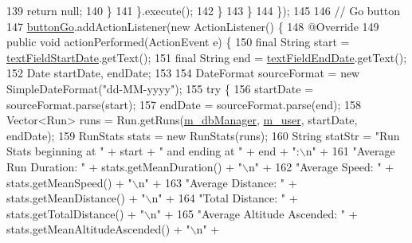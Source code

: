 \begin{DoxyCode}
139                             \textcolor{keywordflow}{return} null;
140                         \}
141                     \}.execute();
142                 \}
143             \}
144         \});
145 
146         \textcolor{comment}{// Go button}
147         \mbox{\hyperlink{classcom_1_1activitytracker_1_1_main_window_ad25fa99a0108ee160ede6865ecf3b6f0}{buttonGo}}.addActionListener(\textcolor{keyword}{new} ActionListener() \{
148             @Override
149             \textcolor{keyword}{public} \textcolor{keywordtype}{void} actionPerformed(ActionEvent e) \{
150                 \textcolor{keyword}{final} String start = \mbox{\hyperlink{classcom_1_1activitytracker_1_1_main_window_a57257f1403dc59df568de3ac51cdb90a}{textFieldStartDate}}.getText();
151                 \textcolor{keyword}{final} String end = \mbox{\hyperlink{classcom_1_1activitytracker_1_1_main_window_ab3ce75740bdeca26fec4325f1d5260e1}{textFieldEndDate}}.getText();
152                 Date startDate, endDate;
153 
154                 DateFormat sourceFormat = \textcolor{keyword}{new} SimpleDateFormat(\textcolor{stringliteral}{"dd-MM-yyyy"});
155                 \textcolor{keywordflow}{try} \{
156                     startDate = sourceFormat.parse(start);
157                     endDate = sourceFormat.parse(end);
158                     Vector<Run> runs = Run.getRuns(\mbox{\hyperlink{classcom_1_1activitytracker_1_1_main_window_ab2af51cb35794567e55564a4d3abbb79}{m\_dbManager}}, 
      \mbox{\hyperlink{classcom_1_1activitytracker_1_1_main_window_a96e28fa47e1740a7ddc16aa48406db85}{m\_user}}, startDate, endDate);
159                     RunStats stats = \textcolor{keyword}{new} RunStats(runs);
160                     String statStr = \textcolor{stringliteral}{"Run Stats beginning at "} + start + \textcolor{stringliteral}{" and ending at "} + end + \textcolor{stringliteral}{":\(\backslash\)n"} +
161                             \textcolor{stringliteral}{"Average Run Duration: "} + stats.getMeanDuration() + \textcolor{stringliteral}{"\(\backslash\)n"} +
162                             \textcolor{stringliteral}{"Average Speed: "} + stats.getMeanSpeed() + \textcolor{stringliteral}{"\(\backslash\)n"} +
163                             \textcolor{stringliteral}{"Average Distance: "} + stats.getMeanDistance() + \textcolor{stringliteral}{"\(\backslash\)n"} +
164                             \textcolor{stringliteral}{"Total Distance: "} + stats.getTotalDistance() + \textcolor{stringliteral}{"\(\backslash\)n"} +
165                             \textcolor{stringliteral}{"Average Altitude Ascended: "} + stats.getMeanAltitudeAscended() + \textcolor{stringliteral}{"\(\backslash\)n"} +

\end{DoxyCode}
